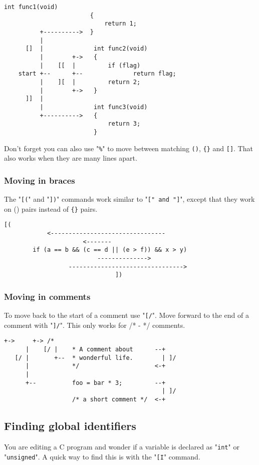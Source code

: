 \begin{Verbatim}[samepage=true]
                        int func1(void)
                        {
                            return 1;
          +---------->  }
          |
      []  |              int func2(void)
          |        +->   {
          |    [[  |         if (flag)
    start +--      +--              return flag;
          |    ][  |         return 2;
          |        +->   }
      ]]  |
          |              int func3(void)
          +---------->   {
                             return 3;
                         }
\end{Verbatim}

Don't forget you can also use "\texttt{\%}" to move between matching \texttt{()}, \texttt{\{\}} and \texttt{[]}.
That also works when they are many lines apart.
\subsubsection{Moving in braces}
The "\texttt{[(}" and "\texttt{])}" commands work similar to "\texttt{[{}" and "\texttt{]}}", except that they work on () pairs instead of \texttt{\{\}} pairs.

\begin{Verbatim}[samepage=true]
                          [(
            <--------------------------------
                      <-------
        if (a == b && (c == d || (e > f)) && x > y) 
                          -------------->
                  -------------------------------->
                               ])
\end{Verbatim}

\subsubsection{Moving in comments}
To move back to the start of a comment use "\texttt{[/}".
Move forward to the end of a comment with "\texttt{]/}".
This only works for /* - */ comments.

\begin{Verbatim}[samepage=true]
      +->     +-> /*
      |    [/ |    * A comment about      --+
   [/ |       +--  * wonderful life.        | ]/
      |            */                     <-+
      |
      +--          foo = bar * 3;         --+
                                            | ]/
                   /* a short comment */  <-+
\end{Verbatim}
\subsection{Finding global identifiers}
You are editing a C program and wonder if a variable is declared as "\texttt{int}" or "\texttt{unsigned}".
A quick way to find this is with the "\texttt{[I}" command.

